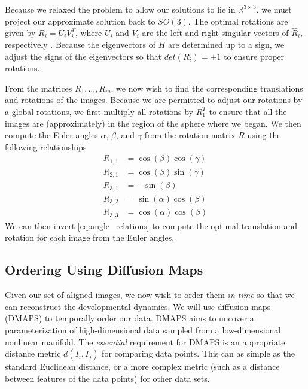 \documentclass[twocolumn, 11pt]{article}
\begin{document}
Because we relaxed the problem to allow our solutions to lie in $\mathbb{R}^{3 \times 3}$, we must project our approximate solution back to $SO(3)$.
%
The optimal rotations are given by $R_i = U_i V_i^T$, where $U_i$ and $V_i$ are the left and right singular vectors of $\hat{R}_i$, respectively \cite{...}. 
%
Because the eigenvectors of $H$ are determined up to a sign, we adjust the signs of the eigenvectors so that $det(R_i) = +1$ to ensure proper rotations.
%

From the matrices $R_1, \dots, R_m$, we now wish to find the corresponding translations and rotations of the images.
%
Because we are permitted to adjust our rotations by a global rotations, we first multiply all rotations by $R_1^T$ to ensure that all the images are (approximately) in the region of the sphere where we began.
%
We then compute the Euler angles $\alpha$, $\beta$, and $\gamma$ from the rotation matrix $R$ using the following relationships
\begin{equation}
\begin{aligned}
R_{1,1} & = \cos(\beta)\cos(\gamma) \\
R_{2,1} & = \cos(\beta)\sin(\gamma) \\
R_{3,1} & = -\sin(\beta) \\
R_{3,2} & = \sin(\alpha)\cos(\beta) \\
R_{3,3} & = \cos(\alpha)\cos(\beta) 
\end{aligned}
\end{equation}
%
We can then invert \eqref{eq:angle_relations} to compute the optimal translation and rotation for each image from the Euler angles.

\subsection{Ordering Using Diffusion Maps}

Given our set of aligned images, we now wish to order them {\em in time} so that we can reconstruct the developmental dynamics.
%
We will use diffusion maps (DMAPS) \cite{coifman2005geometric} to temporally order our data.
%
DMAPS aims to uncover a parameterization of high-dimensional data sampled from a low-dimensional nonlinear manifold.
%
The {\em essential} requirement for DMAPS is an appropriate distance metric $d(I_i, I_j)$ for comparing data points. 
%
This can as simple as the standard Euclidean distance, or a more complex metric (such as a distance between features of the data points) for other data sets.
\end{document}
